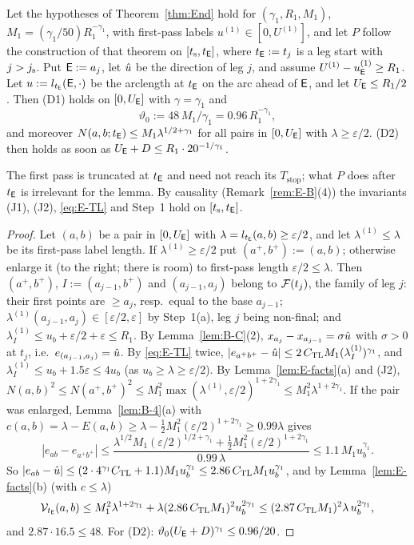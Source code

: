 \begin{lemma}\label{lem:E-H}
Let the hypotheses of Theorem~\ref{thm:End} hold for $(\gamma_1,R_1,M_1)$, $M_1=(\gamma_1/50)R_1^{-\gamma_1}$, with first-pass labels
$u^{(1)}\in[0,U^{(1)}]$, and let $P$ follow the construction of that theorem on $[t_{\mathrm s},t_{\mathsf E}]$, where $t_{\mathsf E}:=t_j$ is a leg start
with $j>j_{\mathrm s}$. Put $\mathsf E:=a_j$, let $\hat u$ be the direction of leg $j$, and assume $U^{(1)}-u^{(1)}_{\mathsf E}\ge R_1$. Let
$u:=l_{t_{\mathsf E}}(\mathsf E,\cdot)$ be the arclength at $t_{\mathsf E}$ on the arc ahead of $\mathsf E$, and let $U_{\mathsf E}\le R_1/2$. Then \textup{(D1)} holds on
$[0,U_{\mathsf E}]$ with $\gamma=\gamma_1$ and
\[
\vartheta_0:=48\,M_1/\gamma_1=0.96\,R_1^{-\gamma_1},
\]
and moreover $N(a,b;t_{\mathsf E})\le M_1\lambda^{1/2+\gamma_1}$ for all pairs in $[0,U_{\mathsf E}]$ with $\lambda\ge\varepsilon/2$. \textup{(D2)}
then holds as soon as $U_{\mathsf E}+D\le R_1\cdot20^{-1/\gamma_1}$.
\end{lemma}
The first pass is truncated at $t_{\mathsf E}$ and need not reach its $T_{\mathrm{stop}}$; what $P$ does after $t_{\mathsf E}$ is irrelevant for the
lemma. By causality (Remark~\ref{rem:E-B}(4)) the invariants (J1), (J2), \eqref{eq:E-TL} and Step~1 hold on $[t_{\mathrm s},t_{\mathsf E}]$.
\begin{proof}
Let $(a,b)$ be a pair in $[0,U_{\mathsf E}]$ with $\lambda=l_{t_{\mathsf E}}(a,b)\ge\varepsilon/2$, and let $\lambda^{(1)}\le\lambda$ be its
first-pass label length. If $\lambda^{(1)}\ge\varepsilon/2$ put $(a^+,b^+):=(a,b)$; otherwise enlarge it (to the right; there is
room) to first-pass length $\varepsilon/2\le\lambda$. Then $(a^+,b^+)$, $I:=(a_{j-1},b^+)$ and $(a_{j-1},a_j)$ belong to
$\mathcal F(t_j)$, the family of leg $j$: their first points are $\ge a_j$, resp.\ equal to the base $a_{j-1}$;
$\lambda^{(1)}(a_{j-1},a_j)\in[\varepsilon/2,\varepsilon]$ by Step~1(a), leg $j$ being non-final; and
$\lambda^{(1)}_I\le u_b+\varepsilon/2+\varepsilon\le R_1$. By Lemma~\ref{lem:B-C}(2), $x_{a_j}-x_{a_{j-1}}=\sigma\hat u$ with
$\sigma>0$ at $t_j$, i.e.\ $e_{(a_{j-1},a_j)}=\hat u$. By \eqref{eq:E-TL} twice,
$|e_{a^+b^+}-\hat u|\le2\,C_{\mathrm{TL}} M_1(\lambda^{(1)}_I)^{\gamma_1}$, and $\lambda^{(1)}_I\le u_b+1.5\varepsilon\le4u_b$ (as
$u_b\ge\lambda\ge\varepsilon/2$). By Lemma~\ref{lem:E-facts}(a) and (J2),
$N(a,b)^2\le N(a^+,b^+)^2\le M_1^2\max(\lambda^{(1)},\varepsilon/2)^{1+2\gamma_1}\le M_1^2\lambda^{1+2\gamma_1}$. If the pair was
enlarged, Lemma~\ref{lem:B-4}(a) with
$c(a,b)=\lambda-E(a,b)\ge\lambda-\frac12M_1^2(\varepsilon/2)^{1+2\gamma_1}\ge0.99\lambda$ gives
\[
|e_{ab}-e_{a^+b^+}|\le\frac{\lambda^{1/2}M_1(\varepsilon/2)^{1/2+\gamma_1}+\frac12M_1^2(\varepsilon/2)^{1+2\gamma_1}}{0.99\,\lambda}
\le1.1\,M_1u_b^{\gamma_1}.
\]
So $|e_{ab}-\hat u|\le(2\cdot4^{\gamma_1}C_{\mathrm{TL}}+1.1)M_1u_b^{\gamma_1}\le2.86\,C_{\mathrm{TL}} M_1u_b^{\gamma_1}$, and by
Lemma~\ref{lem:E-facts}(b) (with $c\le\lambda$)
\[
\mathcal V_{t_{\mathsf E}}(a,b)\le M_1^2\lambda^{1+2\gamma_1}+\lambda(2.86\,C_{\mathrm{TL}} M_1)^2u_b^{2\gamma_1}\le(2.87\,C_{\mathrm{TL}} M_1)^2\lambda\,u_b^{2\gamma_1},
\]
and $2.87\cdot16.5\le48$. For (D2): $\vartheta_0(U_{\mathsf E}+D)^{\gamma_1}\le0.96/20$.
\end{proof}

